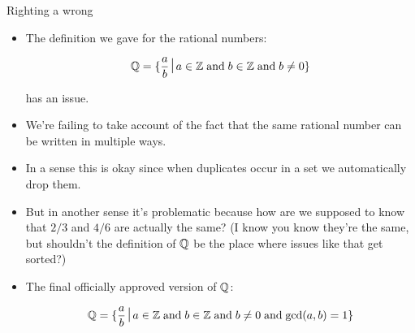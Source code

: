 \documentclass[landscape]{beamer}
\begin{document}
\begin{frame}{Righting a wrong}
\begin{itemize}
\item The definition we gave for the rational numbers:

\[  \Rationals = \{ \frac{a}{b} \suchthat a \in \Integers \; \mbox{and} \;
b \in \Integers \; \mbox{and} \; b \neq 0 \} \]

\noindent has an issue. \pause

\item We're failing to take account of the fact that the same rational number can be written in multiple ways. \pause

\item In a sense this is okay since when duplicates occur in a set we automatically drop them. \pause

\item But in another sense it's problematic because how are we supposed to know that $2/3$ and $4/6$ are actually the same?  (I know you know they're the same, but shouldn't the definition of ${\mathbb Q}$ be the place where issues like that get sorted?) \pause

\item The final officially approved version of ${\mathbb Q}$:

\[  \Rationals = \{ \frac{a}{b} \suchthat a \in \Integers \; \mbox{and} \;
b \in \Integers \; \mbox{and} \; b \neq 0 \; \mbox{and} \; \gcd{a}{b} = 1 \} \]

\end{itemize}
\end{frame}
\end{document}
